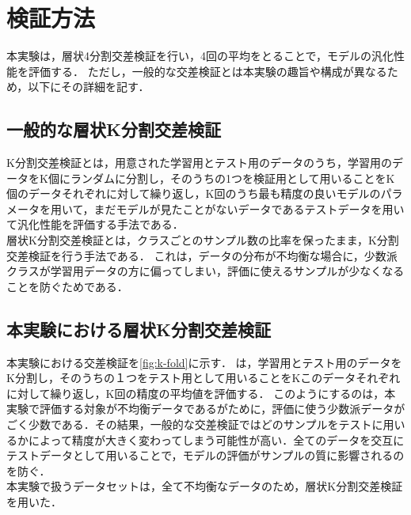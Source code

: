 \section{検証方法}
本実験は，層状4分割交差検証を行い，4回の平均をとることで，モデルの汎化性能を評価する．
ただし，一般的な交差検証とは本実験の趣旨や構成が異なるため，以下にその詳細を記す．

\subsection{一般的な層状K分割交差検証}
K分割交差検証とは，用意された学習用とテスト用のデータのうち，学習用のデータをK個にランダムに分割し，そのうちの1つを検証用として用いることをK個のデータそれぞれに対して繰り返し，K回のうち最も精度の良いモデルのパラメータを用いて，まだモデルが見たことがないデータであるテストデータを用いて汎化性能を評価する手法である．\\

層状K分割交差検証とは，クラスごとのサンプル数の比率を保ったまま，K分割交差検証を行う手法である．
これは，データの分布が不均衡な場合に，少数派クラスが学習用データの方に偏ってしまい，評価に使えるサンプルが少なくなることを防ぐためである．


\subsection{本実験における層状K分割交差検証}
本実験における交差検証を\ref{fig:k-fold}に示す． は，学習用とテスト用のデータをK分割し，そのうちの１つをテスト用として用いることをKこのデータそれぞれに対して繰り返し，K回の精度の平均値を評価する．
このようにするのは，本実験で評価する対象が不均衡データであるがために，評価に使う少数派データがごく少数である．その結果，一般的な交差検証ではどのサンプルをテストに用いるかによって精度が大きく変わってしまう可能性が高い．全てのデータを交互にテストデータとして用いることで，モデルの評価がサンプルの質に影響されるのを防ぐ．\\
本実験で扱うデータセットは，全て不均衡なデータのため，層状K分割交差検証を用いた．

